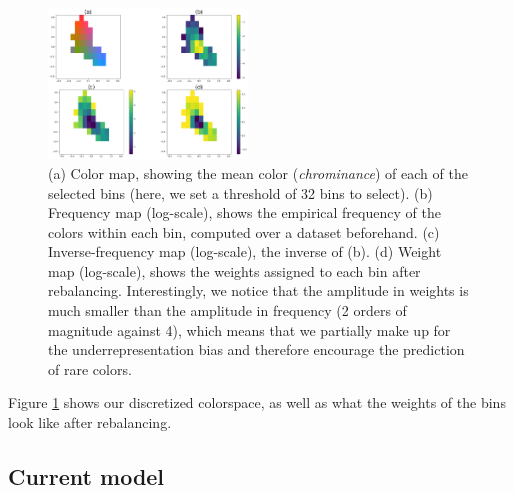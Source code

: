 \documentclass[10pt,twocolumn,letterpaper]{article}
\begin{document}
\begin{figure}
\begin{center}
\includegraphics[width=200px]{img/cdexample.png}
\caption{(a) Color map, showing the mean color (\textit{chrominance}) of each of the selected bins (here, we set a threshold of 32 bins to select). (b) Frequency map (log-scale), shows the empirical frequency of the colors within each bin, computed over a dataset beforehand. (c) Inverse-frequency map (log-scale), \ie the inverse of (b). (d) Weight map (log-scale), shows the weights assigned to each bin after rebalancing. Interestingly, we notice that the amplitude in weights is much smaller than the amplitude in frequency (2 orders of magnitude against 4), which means that we partially make up for the underrepresentation bias and therefore encourage the prediction of rare colors.}
\label{cdex}
\end{center}
\end{figure}

Figure \ref{cdex} shows our discretized colorspace, as well as what the weights of the bins look like after rebalancing.


\subsection{Current model}
\end{document}
